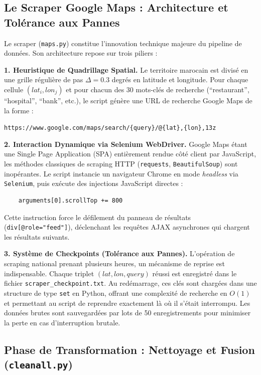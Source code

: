 \subsection{Le Scraper Google Maps : Architecture et Tolérance aux Pannes}

Le scraper (\texttt{maps.py}) constitue l'innovation technique majeure du pipeline de données. Son architecture repose sur trois piliers :

\textbf{1. Heuristique de Quadrillage Spatial.} Le territoire marocain est divisé en une grille régulière de pas $\Delta = 0.3$ degrés en latitude et longitude. Pour chaque cellule $(lat_i, lon_j)$ et pour chacun des 30 mots-clés de recherche (``restaurant'', ``hospital'', ``bank'', etc.), le script génère une URL de recherche Google Maps de la forme :
\begin{center}
\texttt{https://www.google.com/maps/search/\{query\}/@\{lat\},\{lon\},13z}
\end{center}

\textbf{2. Interaction Dynamique via Selenium WebDriver.} Google Maps étant une Single Page Application (SPA) entièrement rendue côté client par JavaScript, les méthodes classiques de scraping HTTP (\texttt{requests}, \texttt{BeautifulSoup}) sont inopérantes. Le script instancie un navigateur Chrome en mode \textit{headless} via \texttt{Selenium}, puis exécute des injections JavaScript directes :
\begin{verbatim}
    arguments[0].scrollTop += 800
\end{verbatim}
Cette instruction force le défilement du panneau de résultats (\texttt{div[@role="feed"]}), déclenchant les requêtes AJAX asynchrones qui chargent les résultats suivants.

\textbf{3. Système de Checkpoints (Tolérance aux Pannes).} L'opération de scraping national prenant plusieurs heures, un mécanisme de reprise est indispensable. Chaque triplet $(lat, lon, query)$ réussi est enregistré dans le fichier \texttt{scraper\_checkpoint.txt}. Au redémarrage, ces clés sont chargées dans une structure de type \texttt{set} en Python, offrant une complexité de recherche en $O(1)$ et permettant au script de reprendre exactement là où il s'était interrompu. Les données brutes sont sauvegardées par lots de 50 enregistrements pour minimiser la perte en cas d'interruption brutale.

\subsection{Phase de Transformation : Nettoyage et Fusion (\texttt{cleanall.py})}

